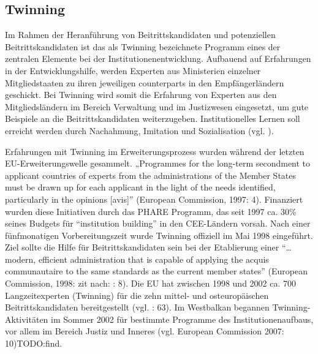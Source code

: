 \subsection{Twinning}
Im Rahmen der Heranführung von Beitrittskandidaten und potenziellen Beitrittskandidaten ist das als Twinning bezeichnete Programm eines der zentralen Elemente bei der Institutionenentwicklung. Aufbauend auf Erfahrungen in der Entwicklungshilfe, werden Experten aus Ministerien einzelner Mitgliedstaaten zu ihren jeweiligen counterparts in den Empfängerländern geschickt. Bei Twinning wird somit die Erfahrung von Experten aus den Mitgliedsländern im Bereich Verwaltung und im Justizwesen eingesetzt, um gute Beispiele an die Beitrittskandidaten weiterzugeben. Institutionelles Lernen soll erreicht werden durch Nachahmung, Imitation und Sozialisation (vgl. \cite{tulmets05}).
\par
Erfahrungen mit Twinning im Erweiterungsprozess wurden während der letzten EU-Erweiterungswelle gesammelt. „Programmes for the long-term secondment to applicant countries of experts from the administrations of the Member States must be drawn up for each applicant in the light of the needs identified, particularly in the opinions [avis]” (European Commission, 1997: 4). Finanziert wurden diese Initiativen durch das PHARE Programm, das seit 1997 ca. 30\% seines Budgets für “institution building” in den CEE-Ländern vorsah. Nach einer fünfmonatigen Vorbereitungszeit wurde Twinning offiziell im Mai 1998 eingeführt. Ziel sollte die Hilfe für Beitrittskandidaten sein bei der Etablierung einer “…modern, efficient administration that is capable of applying the acquis communautaire to the same standards as the current member states” (European Commission, 1998: zit nach: \cite{papadi}: 8). Die EU hat zwischen 1998 und 2002 ca. 700 Langzeitexperten (Twinning) für die zehn mittel- und osteuropäischen Beitrittskandidaten bereitgestellt (vgl. \cite{lipumb04}: 63). Im Westbalkan begannen Twinning-Aktivitäten im Sommer 2002 für bestimmte Programme des Institutionenaufbaus, vor allem im Bereich Justiz und Inneres (vgl. European Commission 2007: 10)TODO:find.\par

